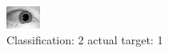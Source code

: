 \begin{figure}[h!]
\begin{center}
\includegraphics[width=0.60\columnwidth]{figures/ID1419_class_2_target_1.png}
\end{center}
\caption{ Classification: 2 actual target: 1}
\label{fig:ID1419_class_2_target_1}
\end{figure}
